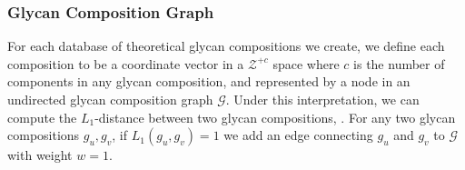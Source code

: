     \subsubsection{Glycan Composition Graph}
        For each database of theoretical glycan compositions we create, we
        define each composition to be a coordinate vector in a $\mathcal{Z}^{+c}$
        space where $c$ is the number of components in any glycan composition,
        and represented by a node in an undirected glycan composition
        graph $\mathcal{G}$. Under this interpretation, we can compute the
        $L_1$-distance between two glycan compositions, . For any two glycan
        compositions $g_u, g_v$, if $L_1(g_u, g_v) = 1$ we add an edge
        connecting $g_u$ and $g_v$ to $\mathcal{G}$ with weight $w = 1$.
